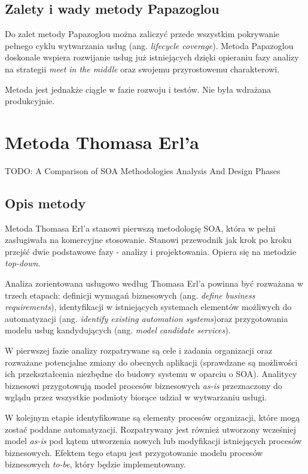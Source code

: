 \subsection{Zalety i wady metody Papazoglou}
Do zalet metody Papazoglou można zaliczyć przede wszystkim pokrywanie pełnego cyklu wytwarzania usług (ang. \emph{lifecycle coverage}). Metoda Papazoglou doskonale wspiera rozwijanie usług już istniejących dzięki opieraniu fazy analizy na strategii \emph{meet in the middle} oraz swojemu przyrostowemu charakterowi. 

Metoda jest jednakże ciągle w fazie rozwoju i testów. Nie była wdrażana produkcyjnie. \cite{RamErvSOA}


\section{Metoda Thomasa Erl'a}
TODO: A Comparison of SOA Methodologies Analysis And Design Phases 

\subsection{Opis metody}
Metoda Thomasa Erl'a stanowi pierwszą metodologię SOA, która w pełni zasługiwała na komercyjne stosowanie. Stanowi przewodnik jak krok po kroku przejść dwie podstawowe fazy - analizy i projektowania. Opiera się na metodzie \emph{top-down}.

Analiza zorientowana usługowo według Thomasa Erl'a powinna być rozważana w trzech etapach: definicji wymagań biznesowych (ang. \emph{define business requirements}), identyfikacji w istniejących systemach elementów możliwych do automatyzacji (ang. \emph{identify  existing 
automation systems})oraz przygotowania modelu usług kandydujących (ang. \emph{model candidate services}). 

W pierwszej fazie analizy rozpatrywane są cele i zadania organizacji oraz rozważane potencjalne zmiany do obecnych aplikacji (sprawdzane są możliwości ich przekształcenia niezbędne do budowy systemu w oparciu o SOA). Analitycy biznesowi przygotowują model procesów biznesowych \emph{as-is} przeznaczony do wglądu przez wszystkie podmioty biorące udział w wytwarzaniu usługi. 

W kolejnym etapie identyfikowane są elementy procesów organizacji, które mogą zostać poddane automatyzacji. Rozpatrywany jest również utworzony wcześniej model \emph{as-is} pod kątem utworzenia nowych lub modyfikacji istniejących procesów biznesowych. Efektem tego etapu jest przygotowanie modelu procesów biznesowych \emph{to-be}, który będzie implementowany.


